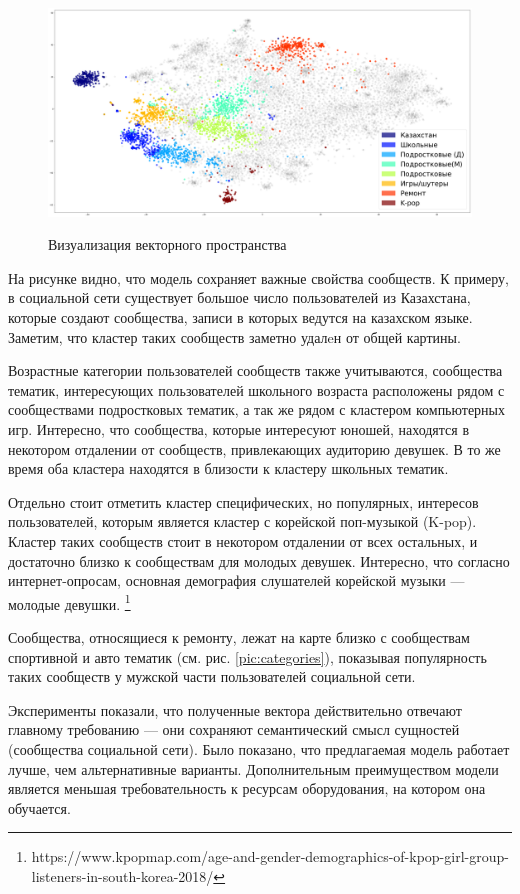 \documentclass[times,specification,annotation]{itmo-student-thesis}
\begin{document}
\begin{figure}[h]
\caption{Визуализация векторного пространства}
\centering
\includegraphics[width=1\textwidth]{clusters}
\label{pic:clusters}
\end{figure}

На рисунке видно, что модель сохраняет важные свойства сообществ. К примеру, в социальной сети существует большое число пользователей из Казахстана, которые создают сообщества, записи в которых ведутся на казахском языке. Заметим, что кластер таких сообществ заметно удалeн от общей картины. 

Возрастные категории пользователей сообществ также учитываются, сообщества тематик, интересующих пользователей школьного возраста расположены рядом с сообществами подростковых тематик, а так же рядом с кластером компьютерных игр. Интересно, что сообщества, которые интересуют юношей, находятся в некотором отдалении от сообществ, привлекающих аудиторию девушек. В то же время оба кластера находятся в близости к кластеру школьных тематик.

Отдельно стоит отметить кластер специфических, но популярных, интересов пользователей, которым является кластер с корейской поп-музыкой (K-pop). Кластер таких сообществ стоит в некотором отдалении от всех остальных, и достаточно близко к сообществам для молодых девушек. Интересно, что согласно интернет-опросам, основная демография слушателей корейской музыки --- молодые девушки. \footnote{https://www.kpopmap.com/age-and-gender-demographics-of-kpop-girl-group-listeners-in-south-korea-2018/}

Сообщества, относящиеся к ремонту, лежат на карте близко с сообществам спортивной и авто тематик (см. рис. \ref{pic:categories}), показывая популярность таких сообществ у мужской части пользователей социальной сети.    

\chapterconclusion

Эксперименты показали, что полученные вектора действительно отвечают главному требованию --- они сохраняют семантический смысл сущностей (сообщества социальной сети). Было показано, что предлагаемая модель работает лучше, чем альтернативные варианты. Дополнительным преимуществом модели является меньшая требовательность к ресурсам оборудования, на котором она обучается. 
\end{document}
